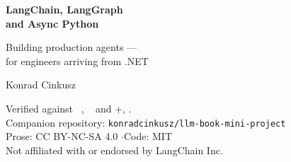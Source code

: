 \thispagestyle{empty}
\begin{center}
\vspace*{3.2cm}

{\Huge\bfseries\color{lcblue} LangChain, LangGraph\\[6pt] and Async Python}

\vspace{1.0cm}
{\Large\color{lcgrey} Building production agents ---\\[4pt]
for engineers arriving from .NET}

\vspace{2.6cm}
{\large Konrad Cinkusz}

\vfill
{\small\color{lcgrey}
Verified against ~\lcver, ~\lgver{} and
\pymin+, \pinnedon.\\[4pt]
Companion repository: \texttt{konradcinkusz/llm-book-mini-project}\\[10pt]
Prose: CC BY-NC-SA 4.0 \quad$\cdot$\quad Code: MIT\\[4pt]
Not affiliated with or endorsed by LangChain Inc.}

\vspace{1.4cm}
\end{center}
\cleardoublepage
